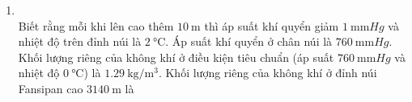 \begin{enumerate}[label=\bfseries Câu \arabic*:, leftmargin=1.7cm]
\item {}\\
Biết rằng mỗi khi lên cao thêm $\SI{10}{\meter}$ thì áp suất khí quyển giảm $\SI{1}{\milli\meter Hg}$ và nhiệt độ trên đỉnh núi là $\SI{2}{\celsius}$. Áp suất khí quyển ở chân núi là $\SI{760}{\milli\meter Hg}$. Khối lượng riêng của không khí ở điều kiện tiêu chuẩn (áp suất $\SI{760}{\milli\meter Hg}$ và nhiệt độ $\SI{0}{\celsius}$) là $\SI{1.29}{\kilogram/\meter^3}$. Khối lượng riêng của không khí ở đỉnh núi Fansipan cao $\SI{3140}{\meter}$ là


\end{enumerate}
